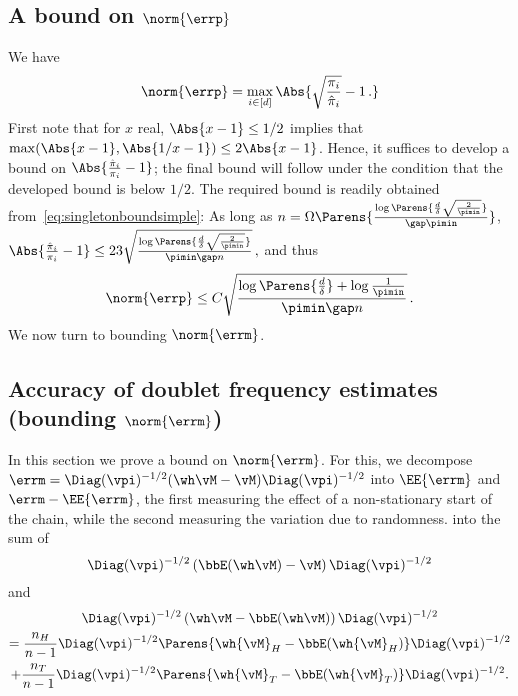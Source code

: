 \subsection{A bound on $\norm{\errp}$}
We have
\begin{align*}
  \norm{\errp}
  = \max_{i\in[d]} \Abs{
    \sqrt{\frac{\pi_i}{\hat\pi_i}} - 1\,.
  }
\end{align*}
First note that for $x$ real, $\Abs{x-1}\le 1/2$ implies that $\max(\Abs{x-1},\Abs{1/x-1}) \le 2 \Abs{x-1}$.
Hence, it suffices to develop a bound on $ \Abs{ \frac{\hat\pi_i}{\pi_i} - 1 }$;
the final bound will follow under the condition that the developed bound is below $1/2$.
The required bound is readily obtained from~\eqref{eq:singletonboundsimple}:
As long as $n = \Omega \Parens{
	\frac{\log\Parens{\frac{d}\delta\sqrt{\frac{2}{\pimin}}}
           }{\gap \pimin} }$, 
$
\Abs{\frac{\hat{\pi}_i}{\pi_i}-1}
\le
23 \sqrt{  
	\frac{\log\Parens{\frac{d}\delta\sqrt{\frac{2}{\pimin}}}
           }{\pimin\gap n}
       }\,,
$
and thus
\begin{align}
\label{eq:singletonbound}
\norm{\errp} \le C \sqrt{ \frac{\log\Parens{\frac{d}\delta} + \log \frac{1}{\pimin} }{\pimin\gap n}} \,.
\end{align}
We now turn to bounding  $\norm{\errm}$.


\subsection{Accuracy of doublet frequency estimates (bounding $\norm{\errm}$)}
\label{sec:pairwise}
In this section we prove a bound on $\norm{\errm}$.
For this, we decompose
$\errm = \Diag(\vpi)^{-1/2}(\wh\vM-\vM)\Diag(\vpi)^{-1/2} $
into $\EE{\errm}$ and 
$
\errm-\EE{\errm}%
$, the first measuring the effect of a non-stationary start of the chain,
while the second measuring the variation due to randomness.
into the sum of
\[
  \Diag(\vpi)^{-1/2}
  \left(\bbE( \wh\vM )- \vM\right)
  \Diag(\vpi)^{-1/2}
\]
and
\begin{multline*}
  \Diag(\vpi)^{-1/2} \left(\wh\vM- \bbE(\wh\vM)\right) \Diag(\vpi)^{-1/2}
  \\
  =
  \frac{n_H}{n-1}
  \Diag(\vpi)^{-1/2}\Parens{
    \wh{\vM}_H - \bbE(\wh{\vM}_H)
  }\Diag(\vpi)^{-1/2}
  \\
  + \frac{n_T}{n-1}
  \Diag(\vpi)^{-1/2}\Parens{
    \wh{\vM}_T - \bbE(\wh{\vM}_T)
  }\Diag(\vpi)^{-1/2}
  .
\end{multline*}
\fi
